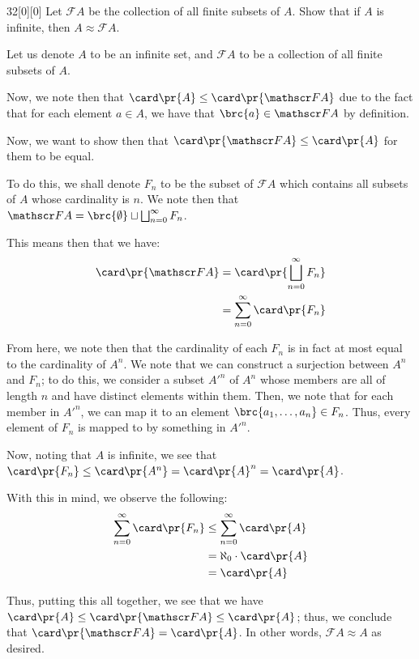 \documentclass{article}
\begin{document}
\begin{hw}{32}[0][0]
	Let $\mathscr F A$ be the collection of all finite subsets of $A$. Show that if $A$ is infinite, then $A \approx \mathscr F A$.
\end{hw}
\begin{solution}
	Let us denote $A$ to be an infinite set, and $\mathscr F A$ to be a collection of all finite subsets of $A$.
	
	Now, we note then that $\card \pr{A} \leq \card\pr{\mathscr F A}$ due to the fact that for each element $a \in A$, we have that $\brc{a} \in \mathscr F A$ by definition.
	
	Now, we want to show then that $\card \pr{\mathscr F A} \leq \card\pr{A}$ for them to be equal.
	
	To do this, we shall denote $F_n$ to be the subset of $\mathscr F A$ which contains all subsets of $A$ whose cardinality is $n$. We note then that $\mathscr F A = \brc{\emptyset} \sqcup \bigsqcup_{n=0}^{\infty} F_n$.
	
	This means then that we have:
	\begin{align*}
		\card \pr{\mathscr F A} &= \card\pr{\bigsqcup_{n=0}^{\infty} F_n} \\
		&= \sum_{n=0}^{\infty} \card\pr{F_n}
	\end{align*}

	From here, we note then that the cardinality of each $F_n$ is in fact at most equal to the cardinality of $A^{n}$. We note that we can construct a surjection between $A^{n}$ and $F_n$; to do this, we consider a subset $A'^{n}$ of $A^{n}$ whose members are all of length $n$ and have distinct elements within them. Then, we note that for each member in $A'^{n}$, we can map it to an element $\brc{a_1, \ldots, a_n} \in F_n$. Thus, every element of $F_n$ is mapped to by something in $A'^{n}$.
	
	Now, noting that $A$ is infinite, we see that $\card \pr{F_n} \leq \card \pr{A^{n}} = \card \pr{A}^{n} = \card \pr{A}$. 
	
	With this in mind, we observe the following:
	\begin{align*}
		\sum_{n=0}^{\infty} \card\pr{F_n} &\leq \sum_{n=0}^{\infty} \card\pr{A} \\
		&= \aleph_0 \cdot \card\pr{A} \\
		&= \card\pr{A}
	\end{align*}

	Thus, putting this all together, we see that we have $\card\pr{A} \leq \card \pr{\mathscr F A} \leq \card\pr{A}$; thus, we conclude that $\card \pr{\mathscr F A} = \card \pr{A}$. In other words, $\mathscr F A \approx A$ as desired.
\end{solution}
\end{document}

